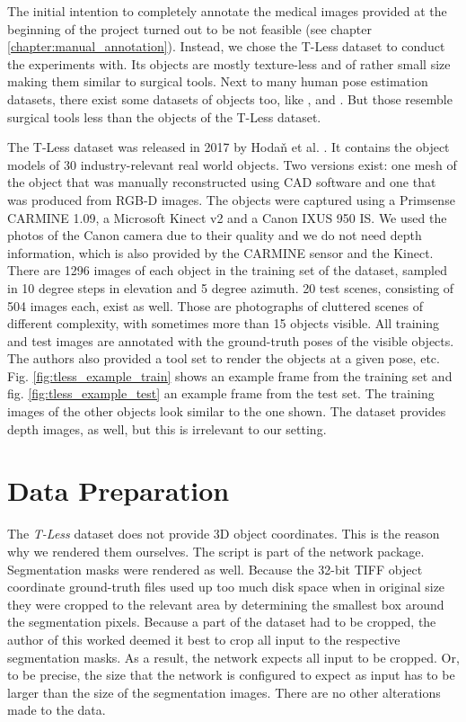 The initial intention to completely annotate the medical images provided at the beginning of the project turned out to be not feasible (see chapter \ref{chapter:manual_annotation}). Instead, we chose the T-Less dataset to conduct the experiments with. Its objects are mostly texture-less  and of rather small size making them similar to surgical tools. Next to many human pose estimation datasets, there exist some datasets of objects too, like \cite{next_view_dataset}, \cite{pracsys_dataset} and \cite{rigid_body_dataset}. But those resemble surgical tools less than the objects of the T-Less dataset.

The T-Less dataset was released in 2017 by Hoda\v{n} et al. \cite{tless}. It contains the object models of 30 industry-relevant real world objects. Two versions exist: one mesh of the object that was manually reconstructed using CAD software and one that was produced from RGB-D images. The objects were captured using a Primsense CARMINE 1.09, a Microsoft Kinect v2 and a Canon IXUS 950 IS. We used the photos of the Canon camera due to their quality and we do not need depth information, which is also provided by the CARMINE sensor and the Kinect. There are 1296 images of each object in the training set of the dataset, sampled in 10 degree steps in elevation and 5 degree azimuth. 20 test scenes, consisting of 504 images each, exist as well. Those are photographs of cluttered scenes of different complexity, with sometimes more than 15 objects visible. All training and test images are annotated with the ground-truth poses of the visible objects. The authors also provided a tool set to render the objects at a given pose, etc. Fig. \ref{fig:tless_example_train} shows an example frame from the training set and fig. \ref{fig:tless_example_test} an example frame from the test set. The training images of the other objects look similar to the one shown. The dataset provides depth images, as well, but this is irrelevant to our setting.

\section{Data Preparation}

The \textit{T-Less} dataset does not provide 3D object coordinates. This is the reason why we rendered them ourselves. The script is part of the network package. Segmentation masks were rendered as well. Because the 32-bit TIFF object coordinate ground-truth files used up too much disk space when in original size they were cropped to the relevant area by determining the smallest box around the segmentation pixels. Because a part of the dataset had to be cropped, the author of this worked deemed it best to crop all input to the respective segmentation masks. As a result, the network expects all input to be cropped. Or, to be precise, the size that the network is configured to expect as input has to be larger than the size of the segmentation images. There are no other alterations made to the data.

